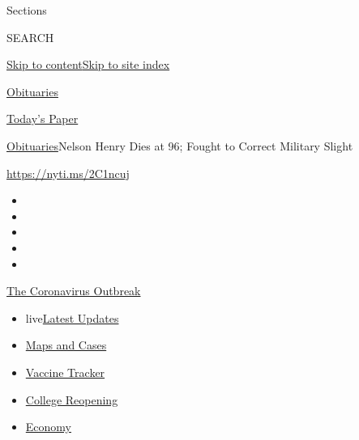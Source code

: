 Sections

SEARCH

\protect\hyperlink{site-content}{Skip to
content}\protect\hyperlink{site-index}{Skip to site index}

\href{https://www.nytimes3xbfgragh.onion/section/obituaries}{Obituaries}

\href{https://myaccount.nytimes3xbfgragh.onion/auth/login?response_type=cookie\&client_id=vi}{}

\href{https://www.nytimes3xbfgragh.onion/section/todayspaper}{Today's
Paper}

\href{/section/obituaries}{Obituaries}\textbar{}Nelson Henry Dies at 96;
Fought to Correct Military Slight

\url{https://nyti.ms/2C1ncuj}

\begin{itemize}
\item
\item
\item
\item
\item
\end{itemize}

\href{https://www.nytimes3xbfgragh.onion/news-event/coronavirus?action=click\&pgtype=Article\&state=default\&region=TOP_BANNER\&context=storylines_menu}{The
Coronavirus Outbreak}

\begin{itemize}
\tightlist
\item
  live\href{https://www.nytimes3xbfgragh.onion/2020/08/04/world/coronavirus-covid-19.html?action=click\&pgtype=Article\&state=default\&region=TOP_BANNER\&context=storylines_menu}{Latest
  Updates}
\item
  \href{https://www.nytimes3xbfgragh.onion/interactive/2020/us/coronavirus-us-cases.html?action=click\&pgtype=Article\&state=default\&region=TOP_BANNER\&context=storylines_menu}{Maps
  and Cases}
\item
  \href{https://www.nytimes3xbfgragh.onion/interactive/2020/science/coronavirus-vaccine-tracker.html?action=click\&pgtype=Article\&state=default\&region=TOP_BANNER\&context=storylines_menu}{Vaccine
  Tracker}
\item
  \href{https://www.nytimes3xbfgragh.onion/2020/08/02/us/covid-college-reopening.html?action=click\&pgtype=Article\&state=default\&region=TOP_BANNER\&context=storylines_menu}{College
  Reopening}
\item
  \href{https://www.nytimes3xbfgragh.onion/live/2020/08/03/business/stock-market-today-coronavirus?action=click\&pgtype=Article\&state=default\&region=TOP_BANNER\&context=storylines_menu}{Economy}
\end{itemize}

